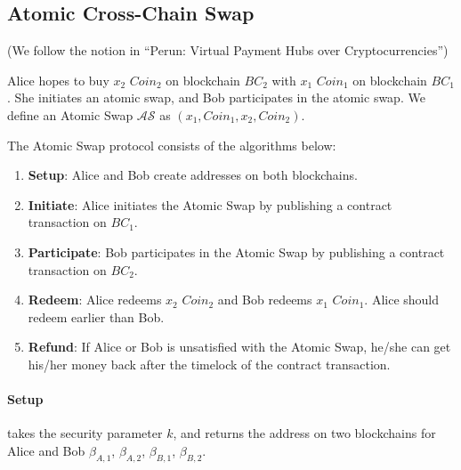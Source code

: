\subsection{Atomic Cross-Chain Swap}

(We follow the notion in ``Perun: Virtual Payment Hubs over Cryptocurrencies'')

Alice hopes to buy $x_2$ $Coin_2$ on blockchain $BC_2$ with $x_1$ $Coin_1$ on blockchain $BC_1$.
She initiates an atomic swap, and Bob participates in the atomic swap.
We define an Atomic Swap $\mathcal{AS}$ as $(x_1, Coin_1, x_2, Coin_2)$.

The Atomic Swap protocol consists of the algorithms below:

\begin{enumerate}
    \item \textbf{Setup}: Alice and Bob create addresses on both blockchains.
    \item \textbf{Initiate}: Alice initiates the Atomic Swap by publishing a contract transaction on $BC_1$.
    \item \textbf{Participate}: Bob participates in the Atomic Swap by publishing a contract transaction on $BC_2$.
    \item \textbf{Redeem}: Alice redeems $x_2$ $Coin_2$ and Bob redeems $x_1$ $Coin_1$. Alice should redeem earlier than Bob.
    \item \textbf{Refund}: If Alice or Bob is unsatisfied with the Atomic Swap, he/she can get his/her money back after the timelock of the contract transaction.
\end{enumerate}

\paragraph{Setup}
takes the security parameter $k$,
and returns the address on two blockchains for Alice and Bob $\beta_{A, 1}$, $\beta_{A, 2}$, $\beta_{B, 1}$, $\beta_{B, 2}$.

